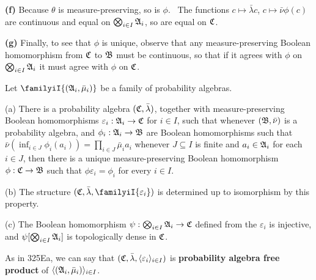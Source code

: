 {\medskip

{\bf (f)} Because $\theta$ is measure-preserving, so is $\phi$.   \Prf\
The functions $c\mapsto\bar\lambda c$, $c\mapsto\bar\nu\phi(c)$ are
continuous and equal on $\bigotimes_{i\in I}\frak A_i$, so are equal on
$\frak C$.\ \Qed

\medskip

{\bf (g)} Finally, to see that $\phi$ is unique, observe that any
measure-preserving Boolean homomorphism from $\frak C$ to $\frak B$ must
be continuous,  so that if it agrees with $\phi$ on
$\bigotimes_{i\in I}\frak A_i$ it must agree with $\phi$ on $\frak C$.
}%

 Let $\familyiI{(\frak A_i,\bar\mu_i)}$ be a
family of probability algebras.

(a) There is a probability algebra $(\frak C,\bar\lambda)$, together
with measure-preserving Boolean homomorphisms
$\varepsilon_i:\frak A_i\to\frak C$ for $i\in I$,
such that whenever $(\frak B,\bar\nu)$ is a probability algebra, and
$\phi_i:\frak A_i\to\frak B$ are
Boolean homomorphisms such that
$\bar\nu(\inf_{i\in J}\phi_i(a_i))=\prod_{i\in J}\bar\mu_ia_i$ whenever
$J\subseteq I$ is
finite and $a_i\in\frak A_i$ for each $i\in J$, then there is a unique
measure-preserving Boolean homomorphism $\phi:\frak C\to\frak B$ such
that $\phi\varepsilon_i=\phi_i$ for every $i\in I$.

(b) The structure $(\frak C,\bar\lambda,\familyiI{\varepsilon_i})$ is
determined up to isomorphism by this property.

(c) The Boolean homomorphism $\psi:\bigotimes_{i\in I}\frak A_i\to\frak C$
defined from the $\varepsilon_i$ is injective, and
$\psi[\bigotimes_{i\in I}\frak A_i]$ is topologically dense in $\frak C$.


 As in 325Ea, we can say that
$(\frak C,\bar\lambda,\langle\varepsilon_i\rangle_{i\in I})$
is {\bf probability algebra free product} of
$\langle(\frak A_i,\bar\mu_i)\rangle_{i\in I}$.

